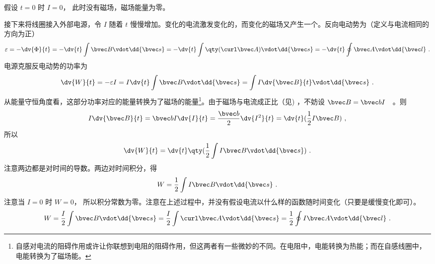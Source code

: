 假设 $t = 0$ 时 $I = 0$， 此时没有磁场，磁场能量为零。

接下来将线圈接入外部电源，令 $I$ 随着 $t$ 慢慢增加。变化的电流激发变化的，而变化的磁场又产生一个。反向电动势为（定义与电流相同的方向为正）
\begin{equation}\label{eq_BEng_2}
\varepsilon  =  - \dv{\Phi}{t} =  - \dv{t} \int \bvec B \vdot \dd{\bvec s} 
=  - \dv{t} \int \qty(\curl \bvec A) \vdot \dd{\bvec s} 
=  - \dv{t} \oint \bvec A \vdot \dd{\bvec l}~.
\end{equation}
电源克服反电动势的功率为
\begin{equation}\label{eq_BEng_3}
\dv{W}{t} =  - \varepsilon I = I\dv{t} \int \bvec B \vdot \dd{\bvec s} = \int I \dv{\bvec B}{t} \vdot \dd{\bvec s}~.
\end{equation}
从能量守恒角度看，这部分功率对应的能量转换为了磁场的能量\footnote{自感对电流的阻碍作用或许让你联想到电阻的阻碍作用，但这两者有一些微妙的不同。在电阻中，电能转换为热能；而在自感线圈中，电能转换为了磁场能。}。由于磁场与电流成正比（见)
，不妨设 $\bvec B = \bvec bI$　。则
\begin{equation}\label{eq_BEng_4}
I \dv{\bvec B}{t} = \bvec bI \dv{I}{t} = \frac{\bvec b}{2} \dv{I^2}{t} = \dv{t} (\frac12 I\bvec B)~,
\end{equation}
所以
\begin{equation}\label{eq_BEng_5}
\dv{W}{t} = \dv{t} \qty(\frac12 \int I\bvec B \vdot \dd{\bvec s})~.
\end{equation}
注意两边都是对时间的导数。两边对时间积分，得
\begin{equation}\label{eq_BEng_6}
W = \frac12 \int I\bvec B \vdot \dd{\bvec s}~.
\end{equation}
注意当 $I = 0$ 时 $ W = 0$， 所以积分常数为零。注意在上述过程中，并没有假设电流以什么样的函数随时间变化（只要是缓慢变化即可）。
\begin{equation}\label{eq_BEng_7}
W = \frac{I}{2} \int \bvec B \vdot \dd{\bvec s}  = \frac{I}{2} \int \curl \bvec A \vdot \dd{\bvec s}  = \frac12 \oint I\bvec A \vdot \dd{\bvec l}~.
\end{equation}
 
